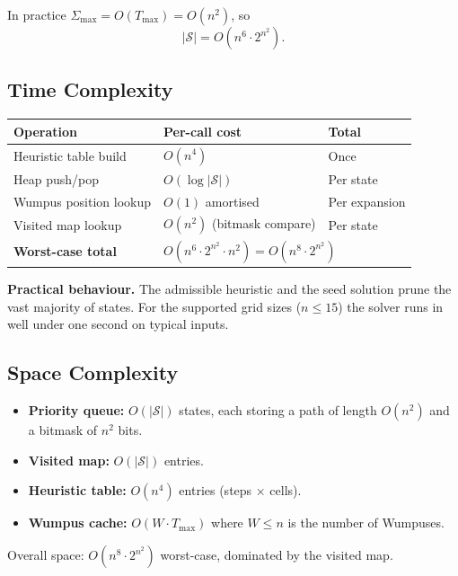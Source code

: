 \documentclass[12pt,a4paper]{article}
\begin{document}
\noindent In practice $\Sigma_{\max} = O(T_{\max}) = O(n^2)$, so
\[
  |\mathcal{S}| = O\!\left(n^6 \cdot 2^{n^2}\right).
\]

\subsection{Time Complexity}

\begin{center}
\begin{tabular}{lll}
\toprule
Operation & Per-call cost & Total \\
\midrule
Heuristic table build & $O(n^4)$ & Once \\
Heap push/pop & $O(\log |\mathcal{S}|)$ & Per state \\
Wumpus position lookup & $O(1)$ amortised & Per expansion \\
Visited map lookup & $O(n^2)$ (bitmask compare) & Per state \\
\midrule
\textbf{Worst-case total} & \multicolumn{2}{l}{$O\!\left(n^6 \cdot 2^{n^2} \cdot n^2\right) = O\!\left(n^8 \cdot 2^{n^2}\right)$} \\
\bottomrule
\end{tabular}
\end{center}

\noindent\textbf{Practical behaviour.} The admissible heuristic and the seed
solution prune the vast majority of states.  For the supported grid sizes
($n \le 15$) the solver runs in well under one second on typical inputs.

\subsection{Space Complexity}

\begin{itemize}
  \item \textbf{Priority queue:} $O(|\mathcal{S}|)$ states, each storing a
        path of length $O(n^2)$ and a bitmask of $n^2$ bits.
  \item \textbf{Visited map:} $O(|\mathcal{S}|)$ entries.
  \item \textbf{Heuristic table:} $O(n^4)$ entries (steps $\times$ cells).
  \item \textbf{Wumpus cache:} $O(W \cdot T_{\max})$ where $W \le n$ is the
        number of Wumpuses.
\end{itemize}

\noindent Overall space: $O\!\left(n^8 \cdot 2^{n^2}\right)$ worst-case,
dominated by the visited map.
\end{document}
